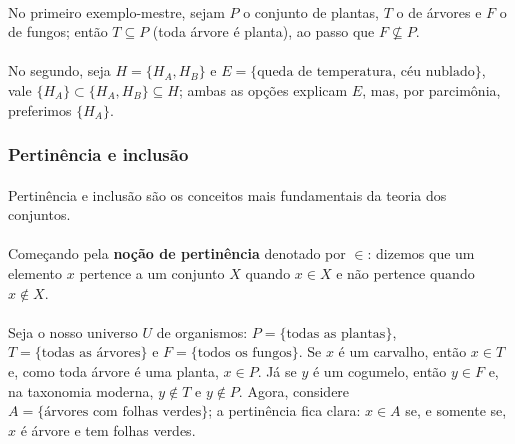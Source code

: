 \documentclass[12pt,a4paper]{article}
\begin{document}
\paragraph{}
No primeiro exemplo-mestre, sejam \(P\) o conjunto de plantas, \(T\) o de árvores e \(F\) o de fungos; então \(T \subseteq P\) (toda árvore é planta), ao passo que \(F \not\subseteq P\).

\paragraph{}
No segundo, seja \(H=\{H_A, H_B\}\) e \(E=\{\text{queda de temperatura},\, \text{céu nublado}\}\), vale \(\{H_A\} \subset \{H_A,H_B\} \subseteq H\); ambas as opções explicam \(E\), mas, 
por parcimônia, preferimos \(\{H_A\}\).

\subsubsection{Pertinência e inclusão}
\paragraph{}

Pertinência e inclusão são os conceitos mais fundamentais da teoria dos conjuntos. 

\paragraph{}
Começando pela \textbf{noção de pertinência} denotado por \(\in\): dizemos que um elemento \(x\) pertence a um conjunto \(X\) quando \(x \in X\) e não pertence quando \(x \notin X\).

\paragraph{}
Seja o nosso universo \(U\) de organismos: \(P=\{\text{todas as plantas}\}\), \(T=\{\text{todas as árvores}\}\) e \(F=\{\text{todos os fungos}\}\). Se \(x\) é um carvalho, então \(x\in T\) e, como toda árvore é uma planta, \(x\in P\). Já se \(y\) é um cogumelo, então \(y\in F\) e, na taxonomia moderna, \(y\notin T\) e \(y\notin P\). Agora, considere \(A=\{\text{árvores com folhas verdes}\}\); a pertinência fica clara: \(x\in A\) se, e somente se, \(x\) é árvore e tem folhas verdes.
\end{document}
